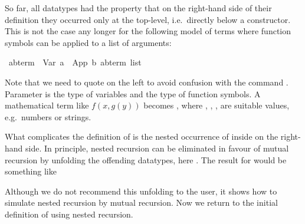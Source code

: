 %
\begin{isabellebody}%
%
\begin{isamarkuptext}%
So far, all datatypes had the property that on the right-hand side of their
definition they occurred only at the top-level, i.e.\ directly below a
constructor. This is not the case any longer for the following model of terms
where function symbols can be applied to a list of arguments:%
\end{isamarkuptext}%
\ {\isacharparenleft}{\isacharprime}a{\isacharcomma}{\isacharprime}b{\isacharparenright}{\isachardoublequote}term{\isachardoublequote}\ {\isacharequal}\ Var\ {\isacharprime}a\ {\isacharbar}\ App\ {\isacharprime}b\ {\isachardoublequote}{\isacharparenleft}{\isacharprime}a{\isacharcomma}{\isacharprime}b{\isacharparenright}term\ list{\isachardoublequote}%
\begin{isamarkuptext}%
\noindent
Note that we need to quote  on the left to avoid confusion with
the command .
Parameter  is the type of variables and  the type of
function symbols.
A mathematical term like $f(x,g(y))$ becomes , where , , ,  are
suitable values, e.g.\ numbers or strings.

What complicates the definition of  is the nested occurrence of
 inside  on the right-hand side. In principle,
nested recursion can be eliminated in favour of mutual recursion by unfolding
the offending datatypes, here . The result for 
would be something like
\medskip


\medskip

\noindent
Although we do not recommend this unfolding to the user, it shows how to
simulate nested recursion by mutual recursion.
Now we return to the initial definition of  using
nested recursion.


\end{isamarkuptext}
\end{isabellebody}

